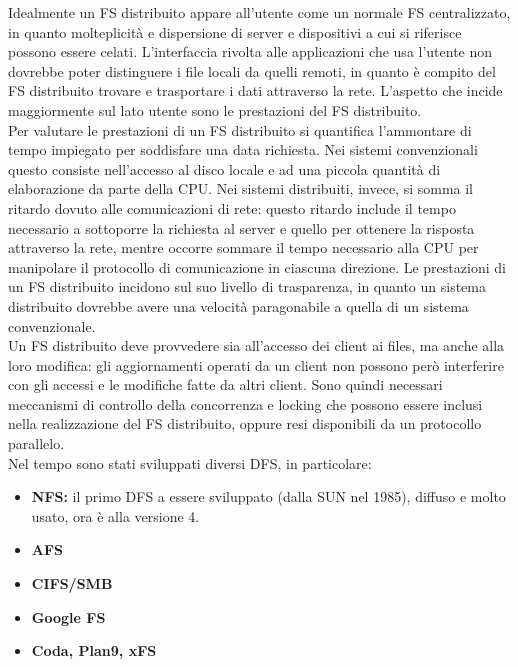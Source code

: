 \documentclass[a4paper]{report}
\begin{document}
Idealmente un FS distribuito appare all'utente come un normale FS centralizzato, in quanto molteplicità e dispersione di server e dispositivi a cui si riferisce possono essere celati. L'interfaccia rivolta alle applicazioni che usa l'utente non dovrebbe poter distinguere i file locali da quelli remoti, in quanto è compito del FS distribuito trovare e trasportare i dati attraverso la rete. L'aspetto che incide maggiormente sul lato utente sono le prestazioni del FS distribuito.\\
Per valutare le prestazioni di un FS distribuito si quantifica l'ammontare di tempo impiegato per soddisfare una data richiesta. Nei sistemi convenzionali questo consiste nell'accesso al disco locale e ad una piccola quantità di elaborazione da parte della CPU. Nei sistemi distribuiti, invece, si somma il ritardo dovuto alle comunicazioni di rete: questo ritardo include il tempo necessario a sottoporre la richiesta al server e quello per ottenere la risposta attraverso la rete, mentre occorre sommare il tempo necessario alla CPU per manipolare il protocollo di comunicazione in ciascuna direzione. Le prestazioni di un FS distribuito incidono sul suo livello di trasparenza, in quanto un sistema distribuito dovrebbe avere una velocità paragonabile a quella di un sistema convenzionale.\\
Un FS distribuito deve provvedere sia all'accesso dei client ai files, ma anche alla loro modifica: gli aggiornamenti operati da un client non possono però interferire con gli accessi e le modifiche fatte da altri client. Sono quindi necessari meccanismi di controllo della concorrenza e locking che possono essere inclusi nella realizzazione del FS distribuito, oppure resi disponibili da un protocollo parallelo.\\
Nel tempo sono stati sviluppati diversi DFS, in particolare:
\begin{itemize}
\item \textbf{NFS:} il primo DFS a essere sviluppato (dalla SUN nel 1985), diffuso e molto usato, ora è alla versione 4.
\item \textbf{AFS}
\item \textbf{CIFS/SMB}
\item \textbf{Google FS}
\item \textbf{Coda, Plan9, xFS}
\end{itemize}
\end{document}
